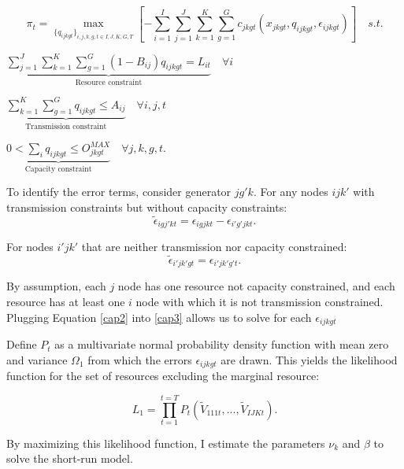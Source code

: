 \documentclass[12pt]{article}
\begin{document}
\begin{equation}
\pi_{t}=\max_{\{q_{ijkgt}\}_{i,j,k,g,t\in I,J,K,G,T}} [-\sum_{i=1}^I\sum_{j=1}^J \sum_{k=1}^K \sum_{g=1}^G c_{jkgt}(x_{jkgt},q_{ijkgt},\epsilon_{ijkgt})] \mspace{18mu} s.t.
 \end{equation}
   \begin{center}
     $\underbrace{\sum_{j=1}^J\sum_{k=1}^K \sum_{g=1}^G (1-B_{ij})q_{ijkgt}=L_{it}}_\text{Resource constraint} \mspace{18mu} \forall i$
 \end{center}
 \begin{center}
    $\underbrace{\sum_{k=1}^K \sum_{g=1}^G q_{ijkgt}\leq A_{ij}}_\text{Transmission constraint} \mspace{18mu} \forall i,j,t$
 \end{center}
   \begin{center}
     $\underbrace{0<\sum_{i} q_{ijkgt}\leq O_{jkgt}^{MAX}}_\text{Capacity constraint} \mspace{18mu} \forall j,k,g,t.$
 \end{center}

To identify the error terms, consider generator $jg'k$. For any nodes $ijk'$ with transmission constraints but without capacity constraints:
\begin{equation}\label{cap3}
\tilde{\epsilon}_{igj'kt}=\epsilon_{igjkt}-\epsilon_{i'g'jkt}.
\end{equation}

For nodes $i'jk'$ that are neither transmission nor capacity constrained:
\begin{equation}\label{cap2}
\tilde{\epsilon}_{i'jk'gt}=\epsilon_{i'jk'g't}.
\end{equation}

By assumption, each $j$ node has one resource not capacity constrained, and each resource has at least one $i$ node with which it is not transmission constrained. Plugging Equation \ref{cap2} into \ref{cap3} allows us to solve for each $\epsilon_{ijkgt}$

Define $P_t$ as a multivariate normal probability density function with mean zero and variance $\Omega_1$ from which the errors $\epsilon_{ijkgt}$ are drawn. This yields the likelihood function for the set of resources excluding the marginal resource:

\begin{equation}\label{likelihoodFunction} L_1= \prod_{t=1}^{t=T} P_t(\tilde{V}_{111t},...,\tilde{V}_{IJKt}). \end{equation}

By maximizing this likelihood function, I estimate the parameters $\nu_k$ and $\beta$ to solve the short-run model.
\end{document}
